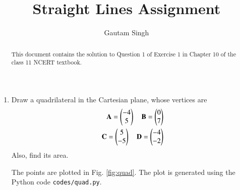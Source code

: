 \documentclass[journal,12pt,twocolumn]{IEEEtran}
\let\vec\mathbf
\begin{document}
\vspace{3cm}
\title{Straight Lines Assignment}
\author{Gautam Singh}
\maketitle
\bigskip

\begin{abstract}
    This document contains the solution to Question 1 of Exercise 1 in Chapter
    10 of the class 11 NCERT textbook.
\end{abstract}

\begin{enumerate}
    \item Draw a quadrilateral in the Cartesian plane, whose vertices are 
    \begin{align}
        \vec{A} = \myvec{-4\\5} \quad \vec{B} = \myvec{0\\7} \\
        \vec{C} = \myvec{5\\-5} \quad \vec{D} = \myvec{-4\\-2}
    \end{align}
    Also, find its area.
    
    \solution The points are plotted in Fig. \ref{fig:quad}. The plot is 
    generated using the Python code \texttt{codes/quad.py}.


\end{enumerate}
\end{document}
